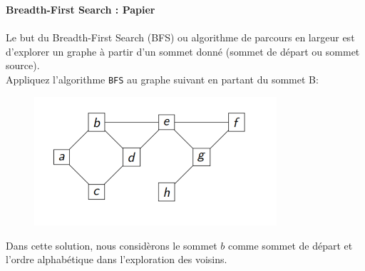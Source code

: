 \begin{Exercice}[10 minutes]\textbf{Breadth-First Search : Papier
}\\
\\
	Le but du Breadth-First Search (BFS) ou algorithme de parcours en largeur est d'explorer un graphe à partir d’un sommet donné (sommet de départ ou sommet source). \\

	Appliquez l’algorithme \lstinline{BFS} au graphe suivant en partant du sommet B:\\

	\begin{figure}[h!]
        		\centering
       	 	\includegraphics[width = 9cm]{resources/exerciceBFS.png}
	\end{figure}


	\begin{solution}
Dans cette solution, nous considèrons le sommet $b$ comme sommet de départ et l'ordre alphabétique dans l'exploration des voisins.\\


\end{solution}
\end{Exercice}
